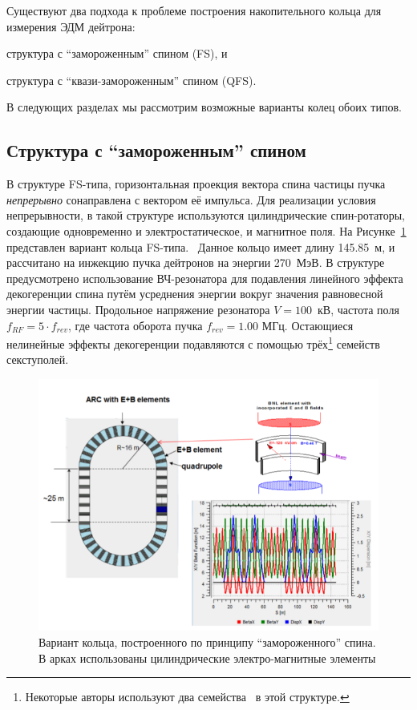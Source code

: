 
Существуют два подхода к проблеме построения накопительного кольца для измерения ЭДМ дейтрона: 
\begin{enumerate*}
	\item структура с ``замороженным'' спином (FS), и 
	\item структура с ``квази-замороженным'' спином (QFS).
\end{enumerate*}

В следующих разделах мы рассмотрим возможные варианты колец обоих типов.

\subsection{Структура с ``замороженным'' спином} \label{chpt2:lattice:FS_BNL}
В структуре FS-типа, горизонтальная проекция вектора спина частицы пучка \emph{непрерывно} сонаправлена с вектором её импульса. Для реализации условия непрерывности, в такой структуре используются цилиндрические спин-ротаторы, создающие одновременно и электростатическое, и магнитное поля. На Рисунке~\ref{fig:BNL_lattice} представлен вариант кольца FS-типа.~\cite{Senichev:Lattices} Данное кольцо имеет длину 145.85~м, и рассчитано на инжекцию пучка дейтронов на энергии 270~МэВ. В структуре предусмотрено использование ВЧ-резонатора для подавления линейного эффекта декогеренции спина путём усреднения энергии вокруг значения равновесной энергии частицы. Продольное напряжение резонатора ${V = 100}$~кВ, частота поля ${f_{RF} = 5\cdot f_{rev}}$, где частота оборота пучка ${f_{rev} = 1.00}$ МГц. Остающиеся нелинейные эффекты декогеренции подавляются с помощью трёх\footnote{Некоторые авторы используют
два семейства~\cite{Eremey:Thesis} в этой структуре.} семейств секступолей.

\begin{figure}[H]
	\centering
	\includegraphics[width=\linewidth]{images/chapter2/BNL_lattice}
	\caption{Вариант кольца, построенного по принципу ``замороженного'' спина. В арках использованы цилиндрические электро-магнитные элементы 
	\label{fig:BNL_lattice}}
\end{figure}


